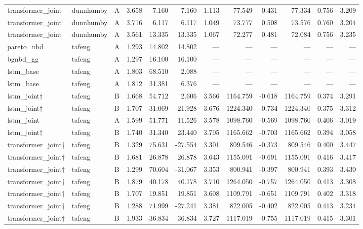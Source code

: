 \begin{table}
\begin{tabular}{lllrrrrrrrrr}
transformer_joint & dunnhumby & A & 3.658 & 7.160 & 7.160 & 1.113 & 77.549 & 0.431 & 77.334 & 0.756 & 3.209 \\
transformer_joint & dunnhumby & A & 3.716 & 6.117 & 6.117 & 1.049 & 73.777 & 0.508 & 73.576 & 0.760 & 3.204 \\
transformer_joint & dunnhumby & A & 3.561 & 13.335 & 13.335 & 1.067 & 72.277 & 0.481 & 72.084 & 0.756 & 3.235 \\
pareto_nbd & tafeng & A & 1.293 & 14.802 & 14.802 & — & — & — & — & — & — \\
bgnbd_gg & tafeng & A & 1.297 & 16.100 & 16.100 & — & — & — & — & — & — \\
lstm_base & tafeng & A & 1.803 & 68.510 & 2.088 & — & — & — & — & — & — \\
lstm_base & tafeng & A & 1.812 & 31.381 & 6.376 & — & — & — & — & — & — \\
lstm_joint† & tafeng & B & 1.668 & 54.712 & 2.606 & 3.566 & 1164.759 & -0.618 & 1164.759 & 0.374 & 3.291 \\
lstm_joint† & tafeng & B & 1.707 & 31.069 & 21.928 & 3.676 & 1224.340 & -0.734 & 1224.340 & 0.375 & 3.312 \\
lstm_joint & tafeng & A & 1.599 & 51.771 & 11.526 & 3.578 & 1098.760 & -0.569 & 1098.760 & 0.406 & 3.019 \\
lstm_joint† & tafeng & B & 1.740 & 31.340 & 23.440 & 3.705 & 1165.662 & -0.703 & 1165.662 & 0.394 & 3.058 \\
transformer_joint† & tafeng & B & 1.329 & 75.631 & -27.554 & 3.301 & 809.546 & -0.373 & 809.546 & 0.400 & 3.447 \\
transformer_joint† & tafeng & B & 1.681 & 26.878 & 26.878 & 3.643 & 1155.091 & -0.691 & 1155.091 & 0.416 & 3.417 \\
transformer_joint† & tafeng & B & 1.299 & 70.604 & -31.067 & 3.353 & 800.941 & -0.397 & 800.941 & 0.393 & 3.430 \\
transformer_joint† & tafeng & B & 1.879 & 40.178 & 40.178 & 3.710 & 1264.050 & -0.757 & 1264.050 & 0.413 & 3.308 \\
transformer_joint† & tafeng & B & 1.707 & 19.851 & 19.851 & 3.608 & 1109.791 & -0.651 & 1109.791 & 0.402 & 3.318 \\
transformer_joint† & tafeng & B & 1.288 & 71.999 & -27.241 & 3.381 & 822.005 & -0.402 & 822.005 & 0.413 & 3.234 \\
transformer_joint† & tafeng & B & 1.933 & 36.834 & 36.834 & 3.727 & 1117.019 & -0.755 & 1117.019 & 0.415 & 3.301 \\

\end{tabular}
\end{table}
